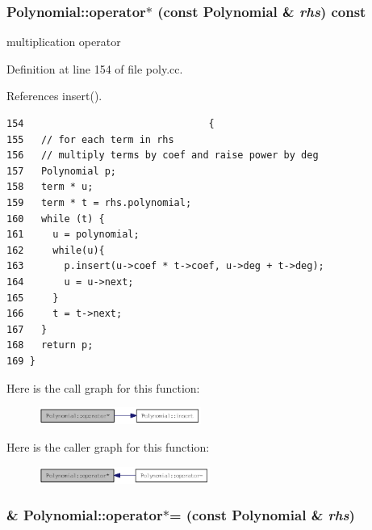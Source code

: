 \hypertarget{classPolynomial_1e00f25b4de1d335f437749c7bd93ac9}{
\subsubsection[operator$\ast$]{ Polynomial::operator$\ast$ (const {\bf Polynomial} \& {\em rhs}) const}}
\label{classPolynomial_1e00f25b4de1d335f437749c7bd93ac9}


multiplication operator 

Definition at line 154 of file poly.cc.

References insert().

\begin{Code}\begin{verbatim}154                                {
155   // for each term in rhs
156   // multiply terms by coef and raise power by deg
157   Polynomial p;
158   term * u;
159   term * t = rhs.polynomial;
160   while (t) {
161     u = polynomial;
162     while(u){
163       p.insert(u->coef * t->coef, u->deg + t->deg);
164       u = u->next;
165     }
166     t = t->next;
167   }
168   return p;
169 }
\end{verbatim}
\end{Code}




Here is the call graph for this function:\nopagebreak
\begin{figure}[H]
\begin{center}
\leavevmode
\includegraphics[width=151pt]{classPolynomial_1e00f25b4de1d335f437749c7bd93ac9_cgraph}
\end{center}
\end{figure}


Here is the caller graph for this function:\nopagebreak
\begin{figure}[H]
\begin{center}
\leavevmode
\includegraphics[width=159pt]{classPolynomial_1e00f25b4de1d335f437749c7bd93ac9_icgraph}
\end{center}
\end{figure}
\hypertarget{classPolynomial_cd98d02bf606b1f1cd7503d7e3b295a6}{
\subsubsection[operator$\ast$=]{ \& Polynomial::operator$\ast$= (const {\bf Polynomial} \& {\em rhs})}}
\label{classPolynomial_cd98d02bf606b1f1cd7503d7e3b295a6}


